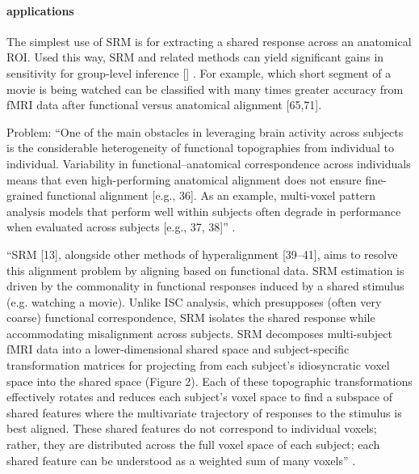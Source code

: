 {\paragraph{applications}
%
The simplest use of SRM is for extracting a shared response across an anatomical
ROI. Used this way, SRM and related methods can yield significant gains in
sensitivity for group-level inference [\citep{chen2015reduced,haxby2011common}]
\citep{cohen2017computational}.
%
For example, which short segment of a movie is being watched can be classified
with many times greater accuracy from fMRI data after functional versus
anatomical alignment [65,71]\citep{cohen2017computational}.


%
Problem: ``One of the main obstacles in leveraging brain activity across
subjects is the considerable heterogeneity of functional topographies from
individual to individual. Variability in functional–anatomical correspondence
across individuals means that even high-performing anatomical alignment does not
ensure fine-grained functional alignment [e.g., 36]. As an example, multi-voxel
pattern analysis models that perform well within subjects often degrade in
performance when evaluated across subjects [e.g., 37, 38]''
\citep{kumar2020brainiak}.

``SRM [13], alongside other methods of hyperalignment [39–41], aims to resolve
this alignment problem by aligning based on functional data. SRM estimation is
driven by the commonality in functional responses induced by a shared stimulus
(e.g. watching a movie). Unlike ISC analysis, which presupposes (often very
coarse) functional correspondence, SRM isolates the shared response while
accommodating misalignment across subjects. SRM decomposes multi-subject fMRI
data into a lower-dimensional shared space and subject-specific transformation
matrices for projecting from each subject’s idiosyncratic voxel space into the
shared space (Figure 2). Each of these topographic transformations effectively
rotates and reduces each subject’s voxel space to find a subspace of shared
features where the multivariate trajectory of responses to the stimulus is best
aligned. These shared features do not correspond to individual voxels; rather,
they are distributed across the full voxel space of each subject; each shared
feature can be understood as a weighted sum of many voxels''
\citep{kumar2020brainiak}.

}
